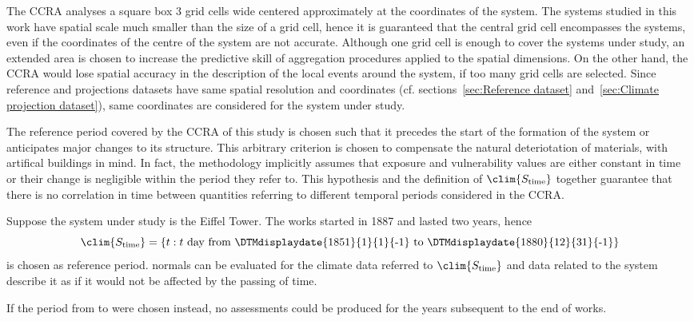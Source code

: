 The \gls{CCRA} analyses a square box 3 grid cells wide centered approximately at the coordinates of the system. The systems studied in this work have spatial scale much smaller than the size of a grid cell, hence it is guaranteed that the central grid cell encompasses the systems, even if the coordinates of the centre of the system are not accurate.
Although one grid cell is enough to cover the systems under study, an extended area is chosen to increase the predictive skill of aggregation procedures applied to the spatial dimensions. On the other hand, the \gls{CCRA} would lose spatial accuracy in the description of the local events around the system, if too many grid cells are selected.
Since reference and projections datasets have same spatial resolution and coordinates (cf. sections~\ref{sec:Reference dataset} and~\ref{sec:Climate projection dataset}), same coordinates are considered for the system under study.

The reference period covered by the \gls{CCRA} of this study is chosen such that it precedes the start of the formation of the system or anticipates major changes to its structure. This arbitrary criterion is chosen to compensate the natural deteriotation of materials, with artifical buildings in mind. In fact, the methodology implicitly assumes that exposure and vulnerability values are either constant in time or their change is negligible within the period they refer to. This hypothesis and the definition of $\clim{S_\text{time}}$ together guarantee that there is no correlation in time between quantities referring to different temporal periods considered in the \gls{CCRA}.
\begin{example}
  Suppose the system under study is the Eiffel Tower. The works started in 1887 and lasted two years, hence
  \begin{equation*}
    \clim{S_\text{time}} = \{ t : \text{$t$ day from \DTMdisplaydate{1851}{1}{1}{-1} to \DTMdisplaydate{1880}{12}{31}{-1}} \}
  \end{equation*}
  is chosen as reference period. \Glspl{normal} can be evaluated for the climate data referred to $\clim{S_\text{time}}$ and data related to the system describe it as if it would not be affected by the passing of time.
  
  If the period from  to  were chosen instead, no assessments could be produced for the years subsequent to the end of works.
\end{example}

